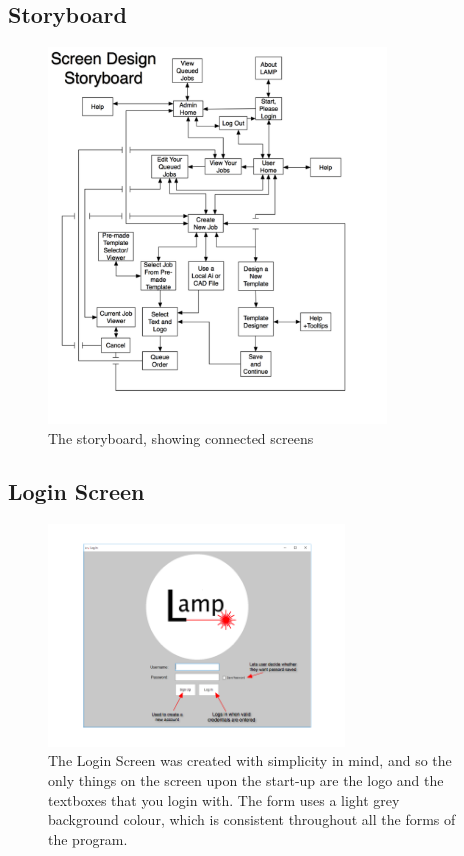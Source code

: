 \documentclass[oneside,openany,11pt,a4paper]{report}
\begin{document}
\subsection{Storyboard}
\begin{figure}[H]
	\centering
\includegraphics[width=0.8\textwidth]{storyboard.png}
\caption{The storyboard, showing connected screens}
\end{figure}


\subsection{Login Screen}
\begin{figure}[H]
\centering
\includegraphics[width=0.7\textwidth]{screen/login.png}
\caption{The Login Screen was created with simplicity in mind, and so the only things on the screen upon the start-up are the logo and the textboxes that you login with. The form uses a light grey background colour, which is consistent throughout all the forms of the program.}
\end{figure}
\end{document}
